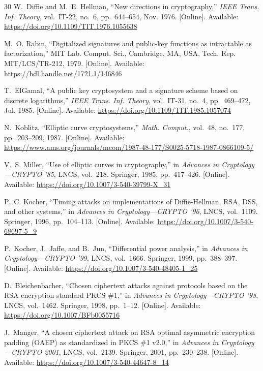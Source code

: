 \documentclass[journal]{IEEEtran}
\begin{document}
\begin{thebibliography}{30}
W.~Diffie and M.~E. Hellman, ``New directions in cryptography,'' \textit{IEEE Trans. Inf. Theory}, vol.~IT-22, no.~6, pp.~644--654, Nov. 1976. [Online]. Available: \url{https://doi.org/10.1109/TIT.1976.1055638}

M.~O. Rabin, ``Digitalized signatures and public-key functions as intractable as factorization,'' MIT Lab. Comput. Sci., Cambridge, MA, USA, Tech. Rep. MIT/LCS/TR-212, 1979. [Online]. Available: \url{https://hdl.handle.net/1721.1/146846}

T.~ElGamal, ``A public key cryptosystem and a signature scheme based on discrete logarithms,'' \textit{IEEE Trans. Inf. Theory}, vol.~IT-31, no.~4, pp.~469--472, Jul. 1985. [Online]. Available: \url{https://doi.org/10.1109/TIT.1985.1057074}

N.~Koblitz, ``Elliptic curve cryptosystems,'' \textit{Math. Comput.}, vol.~48, no.~177, pp.~203--209, 1987. [Online]. Available: \url{https://www.ams.org/journals/mcom/1987-48-177/S0025-5718-1987-0866109-5/}

V.~S. Miller, ``Use of elliptic curves in cryptography,'' in \textit{Advances in Cryptology---CRYPTO '85}, LNCS, vol.~218. Springer, 1985, pp.~417--426. [Online]. Available: \url{https://doi.org/10.1007/3-540-39799-X_31}

P.~C. Kocher, ``Timing attacks on implementations of Diffie-Hellman, RSA, DSS, and other systems,'' in \textit{Advances in Cryptology---CRYPTO '96}, LNCS, vol.~1109. Springer, 1996, pp.~104--113. [Online]. Available: \url{https://doi.org/10.1007/3-540-68697-5_9}

P.~Kocher, J.~Jaffe, and B.~Jun, ``Differential power analysis,'' in \textit{Advances in Cryptology---CRYPTO '99}, LNCS, vol.~1666. Springer, 1999, pp.~388--397. [Online]. Available: \url{https://doi.org/10.1007/3-540-48405-1_25}

D.~Bleichenbacher, ``Chosen ciphertext attacks against protocols based on the RSA encryption standard PKCS \#1,'' in \textit{Advances in Cryptology---CRYPTO '98}, LNCS, vol.~1462. Springer, 1998, pp.~1--12. [Online]. Available: \url{https://doi.org/10.1007/BFb0055716}

J.~Manger, ``A chosen ciphertext attack on RSA optimal asymmetric encryption padding (OAEP) as standardized in PKCS \#1 v2.0,'' in \textit{Advances in Cryptology---CRYPTO 2001}, LNCS, vol.~2139. Springer, 2001, pp.~230--238. [Online]. Available: \url{https://doi.org/10.1007/3-540-44647-8_14}


\end{thebibliography}
\end{document}
